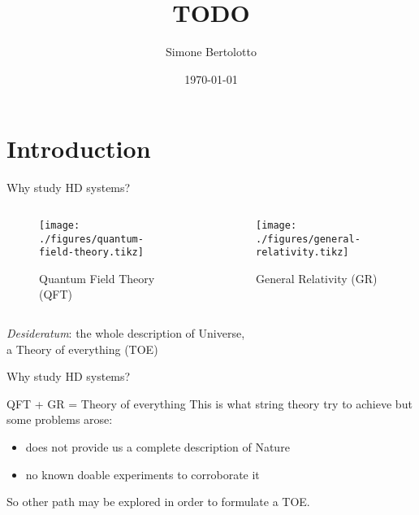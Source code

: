 \documentclass[10pt]{beamer}
\title{TODO}
\date{\today}
\author{Simone Bertolotto}
\institute{Università degli studi di Torino --- Fisica}
\begin{document}
  \maketitle

  \section{Introduction}

  \begin{frame}{Why study HD systems?}
    \begin{columns}
      \begin{column}{0.5\textwidth}
        \begin{figure}
          \texttt{[image: ./figures/quantum-field-theory.tikz]}
          \caption[labelformat=empty]{Quantum Field Theory (QFT)}\label{fig:QFT}
        \end{figure}
      \end{column}
      \begin{column}{0.5\textwidth}
        \begin{figure}
          \texttt{[image: ./figures/general-relativity.tikz]}
          \caption[labelformat=empty]{General Relativity (GR)}\label{fig:GR}
        \end{figure}
      \end{column}
    \end{columns}
    \vspace{1em}
    \begin{center}
      \emph{Desideratum}: the whole description of Universe, \\
      a \alert{Theory of everything} (TOE)
    \end{center}
  \end{frame}

  \begin{frame}{Why study HD systems?}
    \begin{alertblock}{QFT + GR = Theory of everything}
        \vspace{0.5em}
        This is what string theory try to achieve but some problems arose:
        \begin{itemize}
          \item does not provide us a complete description of Nature
          \item no known doable experiments to corroborate it
        \end{itemize}
    \end{alertblock}
    So other path may be explored in order to formulate a TOE\@.
  \end{frame}
\end{document}
